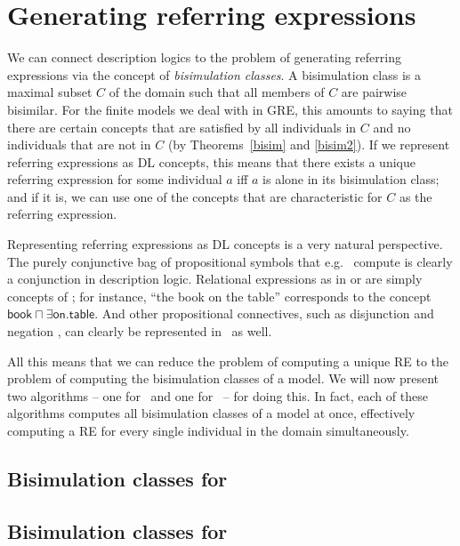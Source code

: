 \section{Generating referring expressions} \label{sec:gre}

We can connect description logics to the problem of generating
referring expressions via the concept of \emph{bisimulation classes}.
A bisimulation class is a maximal subset $C$ of the domain such that
all members of $C$ are pairwise bisimilar.  For the finite models we
deal with in GRE, this amounts to saying that there are certain
concepts that are satisfied by all individuals in $C$ and no
individuals that are not in $C$ (by Theorems~\ref{bisim} and
\ref{bisim2}).  If we represent referring expressions as DL concepts,
this means that there exists a unique referring expression for some
individual $a$ iff $a$ is alone in its bisimulation class; and if it
is, we can use one of the concepts that are characteristic for $C$ as
the referring expression.

Representing referring expressions as DL concepts is a very natural
perspective.  The purely conjunctive bag of propositional symbols that
e.g.\  compute is clearly a conjunction in
description logic.  Relational expressions as in
 or
 are simply concepts of \el; for instance, ``the
book on the table'' corresponds to the concept $\mathsf{book} \sqcap
\exists \mathsf{on}. \mathsf{table}$.  And other propositional
connectives, such as disjunction and negation
\cite{deemter01:_gener_refer_expres}, can clearly be represented in
\alc\ as well.

All this means that we can reduce the problem of computing a unique RE
to the problem of computing the bisimulation classes of a model.  We
will now present two algorithms -- one for \alc\ and one for \el\ --
for doing this.  In fact, each of these algorithms computes all
bisimulation classes of a model at once, effectively computing a RE
for every single individual in the domain simultaneously.


\subsection{Bisimulation classes for \alc}


\subsection{Bisimulation classes for \el}

